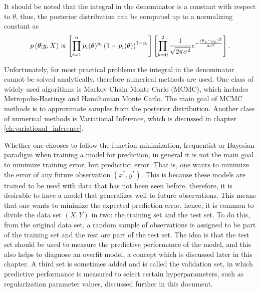 It should be noted that the integral in the denominator is a constant with respect to $\theta$, thus, the posterior distribution can be computed up to a normalizing constant as
\begin{equation}
  p\left( \theta | y, X \right) \propto
  \left[ \prod_{i = 1}^n  p_i(\theta)^{y_i}\left(1 - p_i(\theta) \right)^{1 - y_i} \right]
  \left[ \prod_{k = 0}^2 \frac{1}{\sqrt{2 \pi \sigma^2}} e^{- \frac{(\theta_k - \mu_k)^2}{2\sigma^2}} \right].
\end{equation}

Unfortunately, for most practical problems the integral in the denominator cannot be solved analytically, therefore numerical methods are used. One class of widely used algorithms is Markov Chain Monte Carlo (MCMC), which includes Metropolis-Hastings and Hamiltonian Monte Carlo. The main goal of MCMC methods is to approximate samples from the posterior distribution. Another class of numerical methods is Variational Inference, which is discussed in chapter \ref{ch:variational_inference}.

Whether one chooses to follow the function minimization, frequentist or Bayesian paradigm when training a model for prediction, in general it is not the main goal to minimize training error, but prediction error. That is, one wants to minimize the error of any future observation $(x^*, y^*)$. This is because these models are trained to be used with data that has not been seen before, therefore, it is desirable to have a model that generalizes well to future observations. This means that one wants to minimize the expected prediction error, hence, it is common to divide the data set $(X, Y)$ in two: the training set and the test set. To do this, from the original data set, a random sample of observations is assigned to be part of the training set and the rest are part of the test set. The idea is that the test set should be used to measure the predictive performance of the model, and this also helps to diagnose an overfit model, a concept which is discussed later in this chapter. A third set is sometimes added and is called the validation set, in which predictive performance is measured to select certain hyperparameters, such as regularization parameter values, discussed further in this document.


